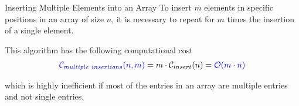         \begin{frame}{Inserting Multiple Elements into an Array}
            To insert $m$ elements in specific positions in an array of size $n$, it is necessary to repeat for $m$ times the insertion of a single element.
    
            \leavevmode
    
            This algorithm has the following computational cost
            \begin{align*}
                \textcolor{blue}{\mathcal{C}_{multiple \ insertions}{\left(n, m\right)}} = m \cdot \mathcal{C}_{insert}{\left(n\right)} = \textcolor{blue}{\mathcal{O}{\left(m \cdot n\right)}}
            \end{align*}

            which is highly inefficient if most of the entries in an array are multiple entries and not single entries.
        \end{frame}